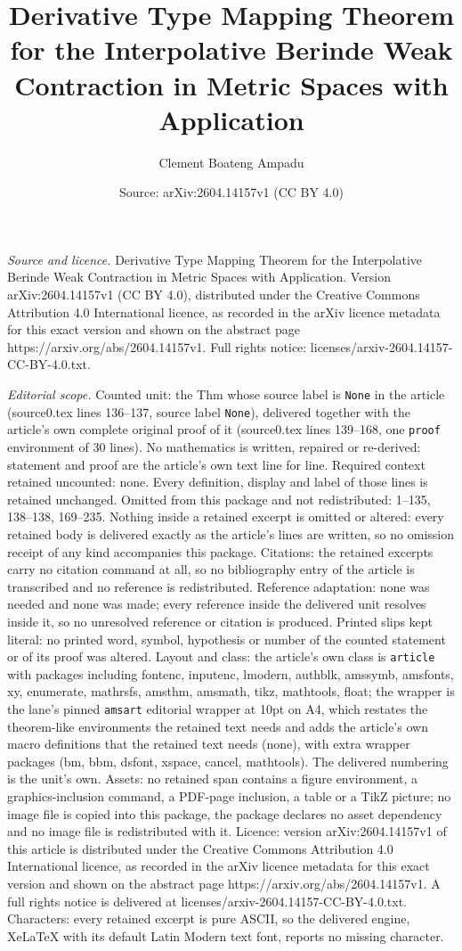 \documentclass[10pt,a4paper]{amsart}
\title[Derivative Type Mapping Theorem for the Interpolative Berind]{Derivative Type Mapping Theorem for the Interpolative Berinde Weak Contraction in Metric Spaces with Application}
\author{Clement Boateng Ampadu}
\date{Source: arXiv:2604.14157v1 (CC BY 4.0)}
\begin{document}
\maketitle

\noindent\emph{Source and licence.} Derivative Type Mapping Theorem for the Interpolative Berinde Weak Contraction in Metric Spaces with Application. Version arXiv:2604.14157v1 (CC BY 4.0), distributed under the Creative Commons Attribution 4.0 International licence, as recorded in the arXiv licence metadata for this exact version and shown on the abstract page https://arxiv.org/abs/2604.14157v1. Full rights notice: licenses/arxiv-2604.14157-CC-BY-4.0.txt.\par\smallskip

\noindent\textit{Editorial scope.} Counted unit: the Thm whose source label is \texttt{None} in the article (source0.tex lines 136--137, source label \texttt{None}), delivered together with the article's own complete original proof of it (source0.tex lines 139--168, one \texttt{proof} environment of 30 lines). No mathematics is written, repaired or re-derived: statement and proof are the article's own text line for line. Required context retained uncounted: none. Every definition, display and label of those lines is retained unchanged. Omitted from this package and not redistributed: 1--135, 138--138, 169--235. Nothing inside a retained excerpt is omitted or altered: every retained body is delivered exactly as the article's lines are written, so no omission receipt of any kind accompanies this package. Citations: the retained excerpts carry no citation command at all, so no bibliography entry of the article is transcribed and no reference is redistributed. Reference adaptation: none was needed and none was made; every reference inside the delivered unit resolves inside it, so no unresolved reference or citation is produced. Printed slips kept literal: no printed word, symbol, hypothesis or number of the counted statement or of its proof was altered. Layout and class: the article's own class is \texttt{article} with packages including fontenc, inputenc, lmodern, authblk, amssymb, amsfonts, xy, enumerate, mathrsfs, amsthm, amsmath, tikz, mathtools, float; the wrapper is the lane's pinned \texttt{amsart} editorial wrapper at 10pt on A4, which restates the theorem-like environments the retained text needs and adds the article's own macro definitions that the retained text needs (none), with extra wrapper packages (bm, bbm, dsfont, xspace, cancel, mathtools). The delivered numbering is the unit's own. Assets: no retained span contains a figure environment, a graphics-inclusion command, a PDF-page inclusion, a table or a TikZ picture; no image file is copied into this package, the package declares no asset dependency and no image file is redistributed with it. Licence: version arXiv:2604.14157v1 of this article is distributed under the Creative Commons Attribution 4.0 International licence, as recorded in the arXiv licence metadata for this exact version and shown on the abstract page https://arxiv.org/abs/2604.14157v1. A full rights notice is delivered at licenses/arxiv-2604.14157-CC-BY-4.0.txt. Characters: every retained excerpt is pure ASCII, so the delivered engine, XeLaTeX with its default Latin Modern text font, reports no missing character.
\end{document}
